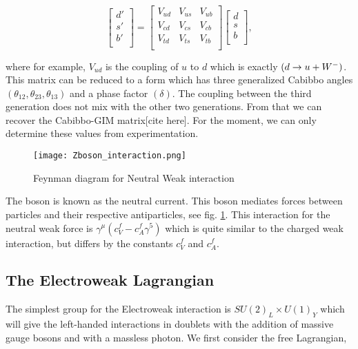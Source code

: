 \begin{equation}\label{CKM}
\begin{bmatrix}
d' \\
s' \\
b' \\
\end{bmatrix} =
\begin{bmatrix}
V_{ud} & V_{us} & V_{ub} \\
V_{cd} & V_{cs} & V_{cb} \\
V_{td} & V_{ts} & V_{tb} \\
\end{bmatrix}
\begin{bmatrix}
d \\
s \\
b \\
\end{bmatrix},
\end{equation}

where for example, $V_{ud}$ is the coupling of $u$ to $d$ which is exactly $(d\rightarrow u+W^-)$. This matrix can be reduced to a form which has three generalized Cabibbo angles $(\theta_{12},\theta_{23},\theta_{13})$ and a phase factor $(\delta)$. The coupling between the third generation does not mix with the other two generations. From that we can recover the Cabibbo-GIM matrix[cite here]. For the moment, we can only determine these values from experimentation. 

\begin{figure}
 	\centering
	\texttt{[image: Zboson\_interaction.png]}
 	\caption{Feynman diagram for Neutral Weak interaction}
 	\label{ZbosonInteraction}
\end{figure}

The \Z boson is known as the neutral current. This boson mediates forces between particles and their respective antiparticles, see fig. \ref{ZbosonInteraction}. This interaction for the neutral weak force is $\gamma^\mu(c_V^f-c_A^f\gamma^5)$ which is quite similar to the charged weak interaction, but differs by the constants $c_V^f$ and $c_A^f$. 

\subsection{The Electroweak Lagrangian}

The simplest group for the Electroweak interaction is $SU(2)_L\times U(1)_Y$ which will give the left-handed interactions in doublets with the addition of massive gauge bosons \W and \Z with a massless photon. We first consider the free Lagrangian,

